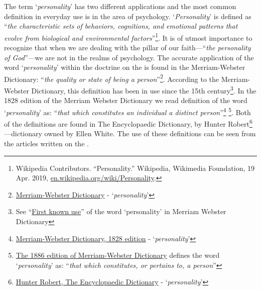 The term ‘\textit{personality}’ has two different applications and the most common definition in everyday use is in the area of psychology. ‘\textit{Personality}’ is defined as “\textit{the characteristic sets of behaviors, cognitions, and emotional patterns that evolve from biological and environmental factors}”\footnote{Wikipedia Contributors. “Personality.” Wikipedia, Wikimedia Foundation, 19 Apr. 2019, \href{https://en.wikipedia.org/wiki/Personality}{en.wikipedia.org/wiki/Personality}.}. It is of utmost importance to recognize that when we are dealing with the pillar of our faith—“\textit{the personality of God}”—we are not in the realms of psychology. The accurate application of the word ‘\textit{personality}’ within the doctrine on the  is found in the Merriam-Webster Dictionary: “\textit{the quality or state of being a person}”\footnote{\href{https://www.merriam-webster.com/dictionary/personality}{Merriam-Webster Dictionary} - ‘\textit{personality}’}. According to the Merriam-Webster Dictionary, this definition has been in use since the 15th century\footnote{See “\href{https://www.merriam-webster.com/dictionary/personality\#word-history}{First known use}” of the word ‘personality’ in Merriam Webster Dictionary}. In the 1828 edition of the Merriam Webster Dictionary we read definition of the word ‘\textit{personality}’ as: “\textit{that which constitutes an individual a distinct person}”\footnote{\href{https://archive.org/details/americandictiona02websrich/page/272/mode/2up}{Merriam-Webster Dictionary, 1828 edition} - ‘\textit{personality}’} \footnote{\href{https://archive.org/details/websterscomplete00webs/page/974/mode/2up}{The 1886 edition of Merriam-Webster Dictionary} defines the word ‘\textit{personality}’ as: “\textit{that which constitutes, or pertains to, a person}”}. Both of the definitions are found in The Encyclopaedic Dictionary, by Hunter Robert\footnote{\href{https://babel.hathitrust.org/cgi/pt?id=mdp.39015050663213&view=1up&seq=780}{Hunter Robert, The Encyclopaedic Dictionary} - ‘\textit{personality}’}—dictionary owned by Ellen White. The use of these definitions can be seen from the articles written on the .


